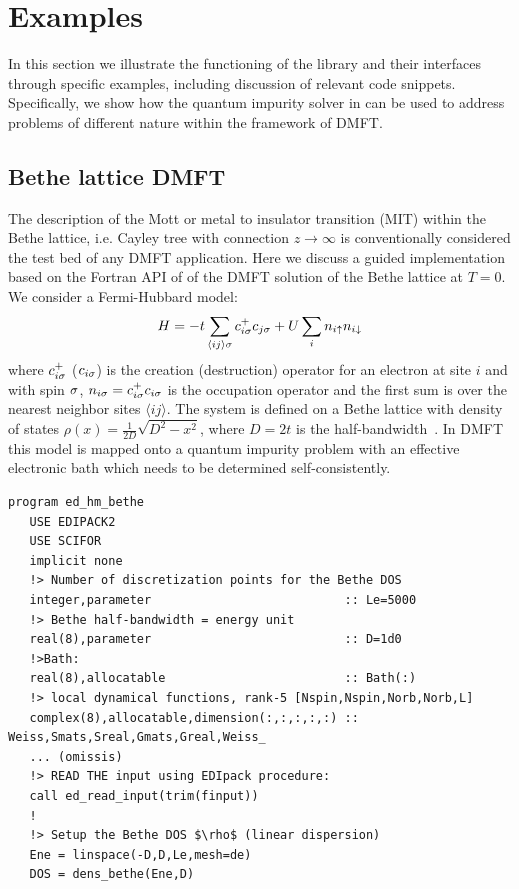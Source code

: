 \documentclass[edipack2.tex]{subfiles}
\begin{document}
\section{Examples}\label{SecExamples}
In this section we illustrate the functioning of the \NAME
library and their interfaces through specific examples, including
discussion of relevant code snippets.
Specifically, we show how the quantum impurity solver in \NAME can be used
to address problems of different nature within the framework of DMFT. 


\subsection{Bethe lattice DMFT}\label{SecExamplesBetheDMFT}
The description of the Mott or metal to insulator transition (MIT)
within the Bethe lattice, i.e. Cayley tree with connection
$z\to\infty$ is conventionally considered the test bed of any DMFT
application. Here  we discuss a guided implementation based on the
Fortran API of \NAME of the DMFT solution of the Bethe lattice at
$T=0$. 
We consider a Fermi-Hubbard model:
$$
H = -t \sum_{\langle ij\rangle\sigma}c^+_{i\sigma}c_{j\sigma} + U \sum_i n_{i\uparrow}n_{i\downarrow}
$$
where $c^+_{i\sigma}$ ($c_{i\sigma}$) is the creation (destruction) operator for an electron at site $i$
and with spin $\sigma$, $n_{i\sigma}=c^+_{i\sigma}c_{i\sigma}$ is the occupation
operator and the first sum is over the nearest neighbor sites $\langle
ij\rangle$. 
The system is defined on a Bethe lattice with density of states
$\rho(x)=\frac{1}{2D}\sqrt{D^2-x^2}$, where $D=2t$ is the
half-bandwidth~\cite{Georges1996}.
In DMFT this model is mapped
onto a quantum impurity problem with an effective electronic bath
which needs to be determined self-consistently.
\begin{lstlisting}[style=fstyle,numbers=none,basicstyle={\scriptsize\ttfamily}]
program ed_hm_bethe
   USE EDIPACK2
   USE SCIFOR
   implicit none
   !> Number of discretization points for the Bethe DOS
   integer,parameter                           :: Le=5000
   !> Bethe half-bandwidth = energy unit
   real(8),parameter                           :: D=1d0
   !>Bath:
   real(8),allocatable                         :: Bath(:)
   !> local dynamical functions, rank-5 [Nspin,Nspin,Norb,Norb,L]
   complex(8),allocatable,dimension(:,:,:,:,:) :: Weiss,Smats,Sreal,Gmats,Greal,Weiss_
   ... (omissis)
   !> READ THE input using EDIpack procedure:
   call ed_read_input(trim(finput))
   !
   !> Setup the Bethe DOS $\rho$ (linear dispersion)
   Ene = linspace(-D,D,Le,mesh=de)
   DOS = dens_bethe(Ene,D)
\end{lstlisting}
\end{document}
